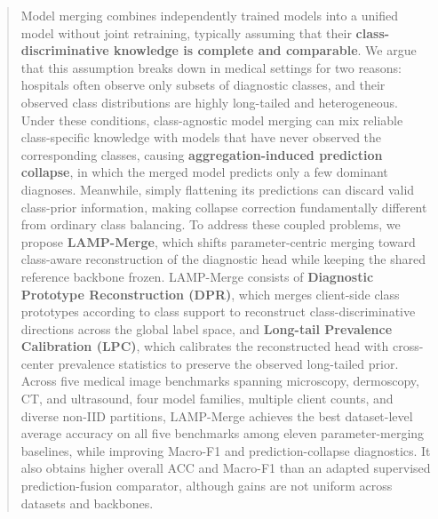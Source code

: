 \documentclass[journal,twoside,web]{ieeecolor}
\begin{document}
\begin{abstract}
Model merging combines independently trained models into a unified model without joint retraining, typically assuming that their \textbf{class-discriminative knowledge is complete and comparable}. We argue that this assumption breaks down in medical settings for two reasons: hospitals often observe only subsets of diagnostic classes, and their observed class distributions are highly long-tailed and heterogeneous. Under these conditions, class-agnostic model merging can mix reliable class-specific knowledge with models that have never observed the corresponding classes, causing \textbf{aggregation-induced prediction collapse}, in which the merged model predicts only a few dominant diagnoses. Meanwhile, simply flattening its predictions can discard valid class-prior information, making collapse correction fundamentally different from ordinary class balancing. To address these coupled problems, we propose \textbf{LAMP-Merge}, which shifts parameter-centric merging toward class-aware reconstruction of the diagnostic head while keeping the shared reference backbone frozen. LAMP-Merge consists of \textbf{Diagnostic Prototype Reconstruction (DPR)}, which merges client-side class prototypes according to class support to reconstruct class-discriminative directions across the global label space, and \textbf{Long-tail Prevalence Calibration (LPC)}, which calibrates the reconstructed head with cross-center prevalence statistics to preserve the observed long-tailed prior. Across five medical image benchmarks spanning microscopy, dermoscopy, CT, and ultrasound, four model families, multiple client counts, and diverse non-IID partitions, LAMP-Merge achieves the best dataset-level average accuracy on all five benchmarks among eleven parameter-merging baselines, while improving Macro-F1 and prediction-collapse diagnostics. It also obtains higher overall ACC and Macro-F1 than an adapted supervised prediction-fusion comparator, although gains are not uniform across datasets and backbones.
\end{abstract}

\end{document}
